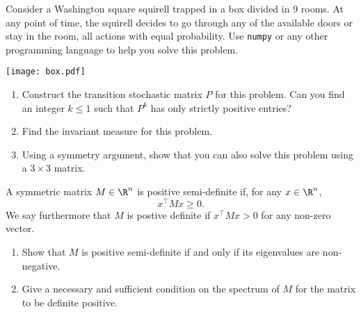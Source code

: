 \documentclass[11pt,nocut]{article}
\begin{document}
\vspace{1cm}

\begin{problem}[3 points]
    Consider a Washington square squirell trapped in a box divided in 9 rooms. At any point of time, the squirell decides to go through any of the available doors or stay in the room, all actions with equal probability. Use \texttt{numpy} or any other programming language to help you solve this problem.\\
    
    \vspace{0.3cm}

    \begin{minipage}{0.2\textwidth}
        \texttt{[image: box.pdf]}
    \end{minipage}
    \begin{minipage}{0.75\textwidth}
        \begin{enumerate}[label=\normalfont(\textbf{\alph*})]
            \item Construct the transition stochastic matrix $P$ for this problem. Can you find an integer $k \leq 1$ such that $P^k$ has only strictly positive entries?
            \item Find the invariant measure for this problem.
            \item Using a symmetry argument, show that you can also solve this problem using a $ 3 \times 3$ matrix.
        \end{enumerate}
    \end{minipage}
        
\end{problem}

\vspace{1cm}

\begin{problem}[$\star$] A symmetric matrix $M \in \R^n$ is positive semi-definite if, for any $x \in \R^n$,
    $$x^\top M x \geq 0.$$
    We say furthermore that $M$ is postive definite if $x^\top M x > 0$ for any non-zero vector.
	\begin{enumerate}[label=\normalfont(\textbf{\alph*})] 
		\item Show that $M$ is positive semi-definite if and only if its eigenvalues are non-negative.
		\item Give a necessary and sufficient condition on the spectrum of $M$ for the matrix to be definite positive.
    \end{enumerate}
\end{problem}



%
%
\end{document}
